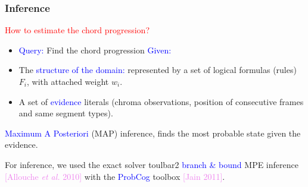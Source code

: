 \documentclass[12pt]{beamer}
\begin{document}



\begin{frame}
\frametitle{Inference}

\textcolor{red}{How to  estimate the chord progression?}
\medskip 

\begin{itemize}
\item \textcolor{blue}{Query:} Find the chord progression \textcolor{blue}{Given:} 

\item The \textcolor{blue}{structure of the domain:} represented by a set of logical formulas (rules) $F_{i}$, with attached weight $w_{i}$.

\item A set of \textcolor{blue}{evidence} literals (chroma observations, position of consecutive frames and same segment types).
\end{itemize}
\medskip 




\textcolor{blue}{Maximum A Posteriori} (MAP) inference, finds the most probable state given the evidence.
\medskip 


For inference, we used the exact solver toulbar2 \textcolor{blue}{branch \& bound} MPE inference \textcolor{violet}{[Allouche \textit{et al.} 2010]} with the \textcolor{blue}{ProbCog} toolbox \textcolor{violet}{[Jain 2011]}.

\end{frame}



\end{document}
